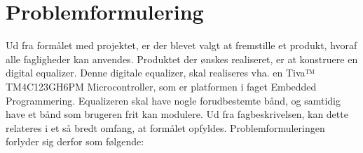 \section{Problemformulering}
%
%


%
Ud fra formålet med projektet, er der blevet valgt at fremstille et produkt, hvoraf alle fagligheder kan anvendes. Produktet der ønskes realiseret, er at konstruere en digital equalizer. Denne digitale equalizer, skal realiseres vha. en Tiva™ TM4C123GH6PM Microcontroller, som er platformen i faget Embedded Programmering. Equalizeren skal have nogle forudbestemte bånd, og samtidig have et bånd som brugeren frit kan modulere. Ud fra fagbeskrivelsen, kan dette relateres i et så bredt omfang, at formålet opfyldes. Problemformuleringen forlyder sig derfor som følgende: \\

